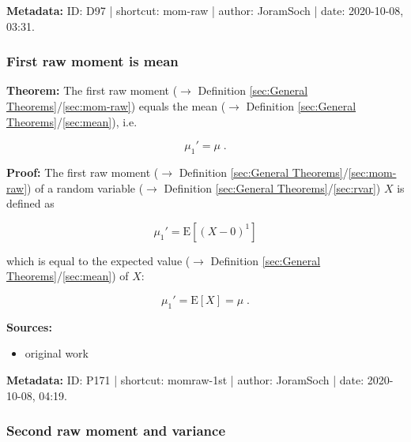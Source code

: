 \documentclass[a4paper,12pt,twoside]{book}
\begin{document}
\vspace{1em}
\textbf{Metadata:} ID: D97 | shortcut: mom-raw | author: JoramSoch | date: 2020-10-08, 03:31.
\vspace{1em}



\subsubsection[\textbf{First raw moment is mean}]{First raw moment is mean} \label{sec:momraw-1st}
\setcounter{equation}{0}

\textbf{Theorem:} The first raw moment ($\rightarrow$ Definition \ref{sec:General Theorems}/\ref{sec:mom-raw}) equals the mean ($\rightarrow$ Definition \ref{sec:General Theorems}/\ref{sec:mean}), i.e.

\begin{equation} \label{eq:momraw-1st-momraw-1st}
\mu_1' = \mu \; .
\end{equation}


\vspace{1em}
\textbf{Proof:} The first raw moment ($\rightarrow$ Definition \ref{sec:General Theorems}/\ref{sec:mom-raw}) of a random variable ($\rightarrow$ Definition \ref{sec:General Theorems}/\ref{sec:rvar}) $X$ is defined as

\begin{equation} \label{eq:momraw-1st-momraw-1st-def}
\mu_1' = \mathrm{E}\left[ (X-0)^1 \right]
\end{equation}

which is equal to the expected value ($\rightarrow$ Definition \ref{sec:General Theorems}/\ref{sec:mean}) of $X$:

\begin{equation} \label{eq:momraw-1st-momraw-1st-qed}
\mu_1' = \mathrm{E}\left[ X \right] = \mu \; .
\end{equation}


\vspace{1em}
\textbf{Sources:}
\begin{itemize}
\item original work\end{itemize}


\vspace{1em}
\textbf{Metadata:} ID: P171 | shortcut: momraw-1st | author: JoramSoch | date: 2020-10-08, 04:19.
\vspace{1em}



\subsubsection[\textbf{Second raw moment and variance}]{Second raw moment and variance} \label{sec:momraw-2nd}
\setcounter{equation}{0}
\end{document}
